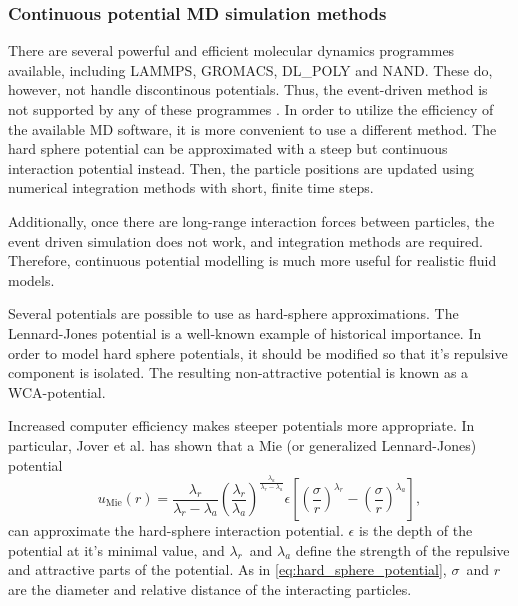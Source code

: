 \subsubsection{Continuous potential MD simulation methods}
There are several powerful and efficient molecular dynamics programmes available,
including LAMMPS, GROMACS, DL\_POLY and NAND. %
These do, however, not handle discontinous potentials.
Thus, the event-driven method is not supported by any of these programmes \cite{ref:allen:MD_sim}.
In order to utilize the efficiency of the available MD software, it is more convenient to use a different method.
The hard sphere potential can be approximated with a steep but continuous interaction potential instead.
Then, the particle positions are updated using numerical integration methods with short, finite time steps.

Additionally, once there are long-range interaction forces between particles,
the event driven simulation does not work, and integration methods are required.
Therefore, continuous potential modelling is much more useful for realistic fluid models.

Several potentials are possible to use as hard-sphere approximations.
The Lennard-Jones potential is a well-known example of historical importance.
In order to model hard sphere potentials, it should be modified so that it's
repulsive component is isolated.
The resulting non-attractive potential is known as a WCA-potential.

Increased computer efficiency makes steeper potentials more appropriate.
In particular, Jover et al. \cite{ref:jover:pseudo_hard} 
has shown that a Mie (or generalized Lennard-Jones) potential
\begin{equation}
    u_{\text{Mie}}(r) = 
        \frac{\lambda_r}{\lambda_r - \lambda_a}
        \left(\frac{\lambda_r}{\lambda_a}\right)
        ^{\frac{\lambda_a}{\lambda_r - \lambda_a}}
        \epsilon \left[
            \left(\frac{\sigma}{r}\right)^{\lambda_r} -
            \left(\frac{\sigma}{r}\right)^{\lambda_a}
        \right],
\end{equation}
can approximate the hard-sphere interaction potential.
$\epsilon$ is the depth of the potential at it's minimal value, 
and $\lambda_r$ and $\lambda_a$ define the strength of the 
repulsive and attractive parts of the potential.
As in \eqref{eq:hard_sphere_potential}, 
$\sigma$ and $r$ are the diameter and relative distance of the interacting particles.

